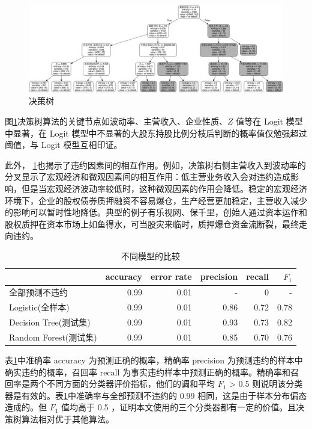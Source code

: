 \begin{figure}[ht]
	\centering
	\includegraphics[width=\linewidth]{./data/decision_tree.png}
	\caption{\label{fig:decision_tree}决策树}
\end{figure}

图\ref{fig:decision_tree}决策树算法的关键节点如波动率、主营收入、企业性质、\(Z\) 值等在 Logit 模型中显著，在 Logit 模型中不显著的大股东持股比例分枝后判断的概率值仅勉强超过阈值，与 Logit 模型互相印证。

此外， \ref{fig:decision_tree}也揭示了违约因素间的相互作用。例如，决策树右侧主营收入到波动率的分叉显示了宏观经济和微观因素间的相互作用：低主营业务收入会对违约造成影响，但是当宏观经济波动率较低时，这种微观因素的作用会降低。稳定的宏观经济环境下，企业的股权债券质押融资不容易爆仓，生产经营更加稳定，主营收入减少的影响可以暂时性地降低。典型的例子有乐视网、保千里，创始人通过资本运作和股权质押在资本市场上如鱼得水，可当股灾来临时，质押爆仓资金流断裂，最终走向违约。

\begin{table}
	\caption{\label{tab:acc}不同模型的比较}
	\centering
	\begin{tabular}{lrrrrr}
		\toprule
		                   & accuracy & error rate & precision & recall & \(F_1\) \\
		\midrule
		全部预测不违约            & 0.99     & 0.01       & -         & 0      & -       \\
		Logistic(全样本)      & 0.99     & 0.01       & 0.86      & 0.72   & 0.78    \\
		Decision Tree(测试集) & 0.99     & 0.01       & 0.93      & 0.73   & 0.82    \\
		Random Forest(测试集) & 0.99     & 0.01       & 0.85      & 0.70   & 0.76    \\
		\bottomrule
	\end{tabular}
\end{table}

表\ref{tab:acc}中准确率 accuracy 为预测正确的概率，精确率 precision 为预测违约的样本中确实违约的概率，召回率 recall 为事实违约样本中预测正确的概率。精确率和召回率是两个不同方面的分类器评价指标，他们的调和平均 \(F_1\) > 0.5 则说明该分类器是有效的。表\ref{tab:acc}中准确率与全部预测不违约的 0.99 相同，这是由于样本分布偏态造成的。但 \(F_1\) 值均高于 0.5 ，证明本文使用的三个分类器都有一定的价值。且决策树算法相对优于其他算法。

